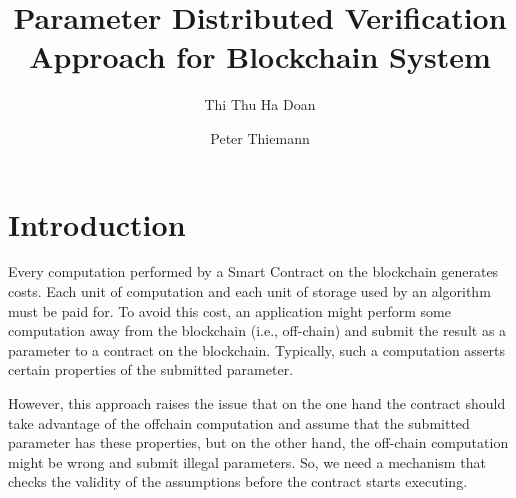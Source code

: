 \documentclass[runningheads]{llncs}
\begin{document}
%
\title{Parameter Distributed Verification Approach for Blockchain System}
%
%
\author{Thi Thu Ha Doan\and Peter Thiemann}

%
%
%
\maketitle              %
%
\begin{abstract}

 \keywords{}
\end{abstract}
%
%
%
\section{Introduction}
\label{sec:introduction}

Every computation performed by a Smart Contract on the blockchain generates costs. Each
unit of computation and each unit of storage used by an algorithm must be paid for. To
avoid this cost, an application might perform some computation away from the blockchain
(i.e., off-chain) and submit the result as a parameter to a contract on the
blockchain. Typically, such a computation asserts certain properties of the 
submitted parameter. 

However, this approach raises the issue that on the one hand the contract should take
advantage of the offchain computation and assume that the submitted parameter has
these properties, but on the other hand, the off-chain computation might be wrong and
submit illegal parameters. So, we need a mechanism that checks the validity of the
assumptions before the contract starts executing.
\end{document}
